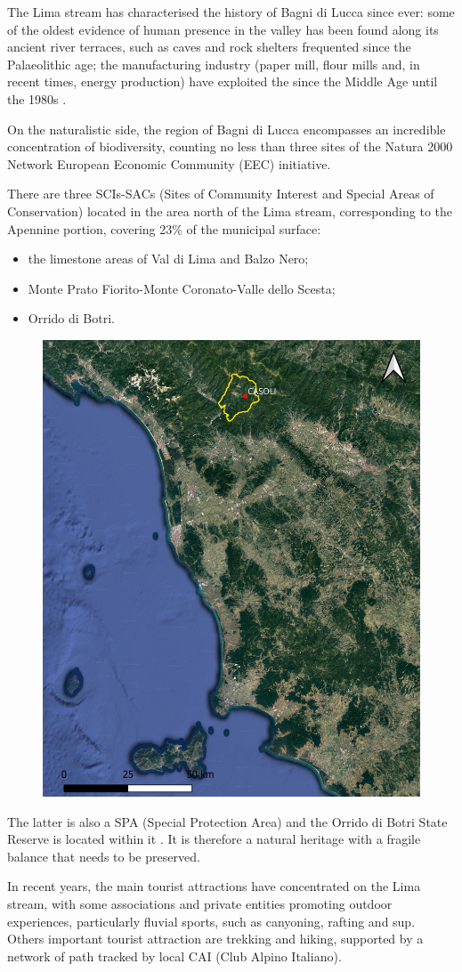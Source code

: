 \documentclass[sustainability,article,submit,pdftex,moreauthors]{Definitions/mdpi}
\begin{document}
The Lima stream has characterised the history of Bagni di Lucca since ever: some of the oldest evidence of human presence in the valley has
been found along its ancient river terraces, such as caves and rock shelters frequented since the Palaeolithic age; the
manufacturing industry (paper mill, flour mills and, in recent times, energy production) have exploited the since the Middle Age until the 1980s \cite{men76, bed05, ser21}.
 
On the naturalistic side, the region of Bagni di Lucca encompasses an incredible concentration of biodiversity, counting no less than three sites of the Natura 2000 Network \cite{natura2000} European Economic Community (EEC) initiative.

There are three SCIs-SACs (Sites of Community Interest and Special Areas of Conservation) located in the area north of the Lima stream, corresponding to the Apennine portion, covering 23\% of the municipal surface:
\begin {itemize}
\item the limestone areas of Val di Lima and Balzo Nero; 
\item Monte Prato Fiorito-Monte Coronato-Valle dello
Scesta; 
\item Orrido di Botri.
\end{itemize}

\begin{figure}
	\centering
	\includegraphics[width=0.3\linewidth]{figure/toscana-casoli}
	\caption[The region of Casoli]{}
	\label{fig:toscana-casoli}
\end{figure}


The latter is also a SPA (Special Protection Area) and the Orrido di Botri State Reserve is located within it \cite{nat00}. It is therefore a natural heritage with a fragile balance that needs to be preserved.

In recent years, the main tourist attractions have concentrated on the Lima stream, with some associations and private entities promoting outdoor experiences, particularly fluvial sports, such as canyoning, rafting and sup. Others important tourist attraction are trekking and hiking, supported by a network of path tracked by local CAI (Club Alpino Italiano).
\end{document}
